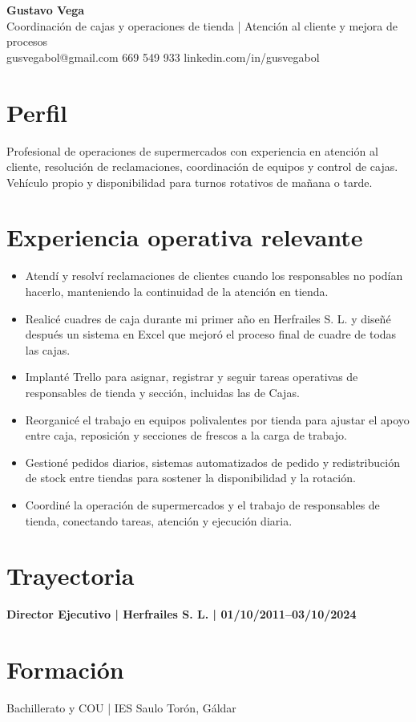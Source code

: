\documentclass[11pt,a4paper]{article}
\begin{document}
{\color{primary}\LARGE\textbf{Gustavo Vega}}\\
{\color{secondary}\large Coordinación de cajas y operaciones de tienda | Atención al cliente y mejora de procesos}\\
gusvegabol@gmail.com \textbar{} 669 549 933 \textbar{} linkedin.com/in/gusvegabol

\section*{Perfil}
Profesional de operaciones de supermercados con experiencia en atención al cliente, resolución de reclamaciones, coordinación de equipos y control de cajas.
Vehículo propio y disponibilidad para turnos rotativos de mañana o tarde.\\

\section*{Experiencia operativa relevante}
\begin{itemize}[leftmargin=*,nosep]
\item Atendí y resolví reclamaciones de clientes cuando los responsables no podían hacerlo, manteniendo la continuidad de la atención en tienda.
\item Realicé cuadres de caja durante mi primer año en Herfrailes S. L. y diseñé después un sistema en Excel que mejoró el proceso final de cuadre de todas las cajas.
\item Implanté Trello para asignar, registrar y seguir tareas operativas de responsables de tienda y sección, incluidas las de Cajas.
\item Reorganicé el trabajo en equipos polivalentes por tienda para ajustar el apoyo entre caja, reposición y secciones de frescos a la carga de trabajo.
\item Gestioné pedidos diarios, sistemas automatizados de pedido y redistribución de stock entre tiendas para sostener la disponibilidad y la rotación.
\item Coordiné la operación de supermercados y el trabajo de responsables de tienda, conectando tareas, atención y ejecución diaria.
\end{itemize}

\section*{Trayectoria}
\textbf{Director Ejecutivo | Herfrailes S. L. | 01/10/2011–03/10/2024}

\section*{Formación}
Bachillerato y COU | IES Saulo Torón, Gáldar\\
\end{document}
